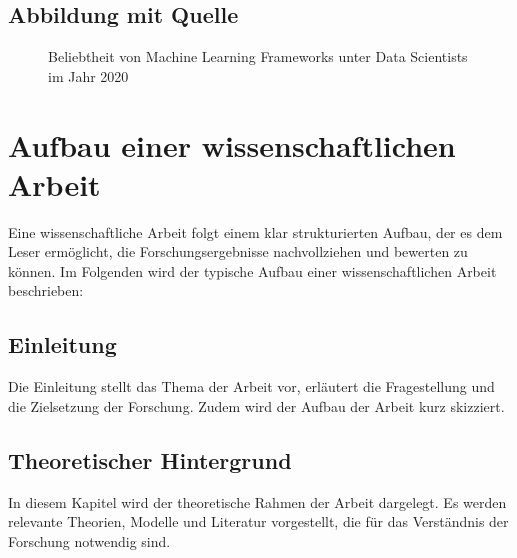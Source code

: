 \section{Abbildung mit Quelle}

\begin{figure}[h!]
	\centering
	\vspace{10pt}
	\caption[Beliebtheit von Machine Learning Frameworks unter Data Scientists im Jahr 2020]{Beliebtheit von Machine Learning Frameworks unter Data Scientists im Jahr 2020 \protect{}}\label{fig:kaggleDataScienceReport}
\end{figure}

\chapter{Aufbau einer wissenschaftlichen Arbeit}

Eine wissenschaftliche Arbeit folgt einem klar strukturierten Aufbau, der es dem Leser ermöglicht, die Forschungsergebnisse nachvollziehen und bewerten zu können. Im Folgenden wird der typische Aufbau einer wissenschaftlichen Arbeit beschrieben:

\section{Einleitung}
Die Einleitung stellt das Thema der Arbeit vor, erläutert die Fragestellung und die Zielsetzung der Forschung. Zudem wird der Aufbau der Arbeit kurz skizziert.

\section{Theoretischer Hintergrund}
In diesem Kapitel wird der theoretische Rahmen der Arbeit dargelegt. Es werden relevante Theorien, Modelle und Literatur vorgestellt, die für das Verständnis der Forschung notwendig sind.

